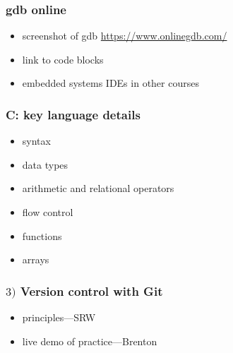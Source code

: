 \documentclass[english,14pt]{beamer}
\begin{document}

\begin{frame}[fragile]

\frametitle{gdb online}

\begin{itemize}
	\item screenshot of gdb \href{https://www.onlinegdb.com/}{https://www.onlinegdb.com/}
	\item link to code blocks
	\item embedded systems IDEs in other courses	
\end{itemize}

\end{frame}


\begin{frame}[fragile]

\frametitle{C: key language details}

\begin{itemize}
	\item syntax
	\item data types
	\item arithmetic and relational operators
	\item flow control
	\item functions
	\item arrays
\end{itemize}

\end{frame}


\begin{frame}[fragile]

\frametitle{$3)$ Version control with Git}

\begin{itemize}
	\item principles---SRW
	\item live demo of practice---Brenton
\end{itemize}

\end{frame}

\end{document}
